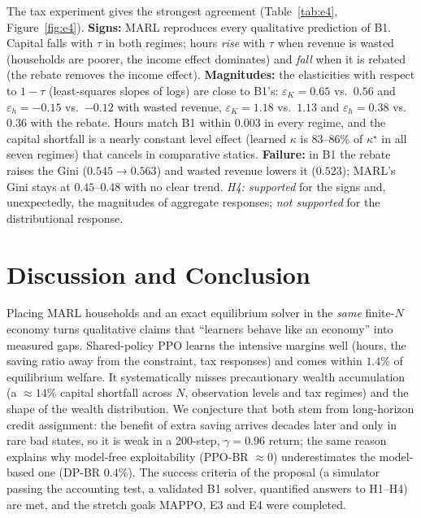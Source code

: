 \documentclass{article}
\begin{document}
The tax experiment gives the strongest agreement (Table~\ref{tab:e4}, Figure~\ref{fig:e4}). \textbf{Signs:} MARL reproduces every qualitative prediction of B1. Capital falls with $\tau$ in both regimes; hours \emph{rise} with $\tau$ when revenue is wasted (households are poorer, the income effect dominates) and \emph{fall} when it is rebated (the rebate removes the income effect). \textbf{Magnitudes:} the elasticities with respect to $1-\tau$ (least-squares slopes of logs) are close to B1's: $\varepsilon_K=0.65$ vs.\ $0.56$ and $\varepsilon_h=-0.15$ vs.\ $-0.12$ with wasted revenue, $\varepsilon_K=1.18$ vs.\ $1.13$ and $\varepsilon_h=0.38$ vs.\ $0.36$ with the rebate. Hours match B1 within $0.003$ in every regime, and the capital shortfall is a nearly constant level effect (learned $\kappa$ is $83$--$86\%$ of $\kappa^\star$ in all seven regimes) that cancels in comparative statics. \textbf{Failure:} in B1 the rebate raises the Gini ($0.545\to0.563$) and wasted revenue lowers it ($0.523$); MARL's Gini stays at $0.45$--$0.48$ with no clear trend. \emph{H4: supported} for the signs and, unexpectedly, the magnitudes of aggregate responses; \emph{not supported} for the distributional response.

\FloatBarrier %
\section{Discussion and Conclusion}
Placing MARL households and an exact equilibrium solver in the \emph{same} finite-$N$ economy turns qualitative claims that ``learners behave like an economy'' into measured gaps. Shared-policy PPO learns the intensive margins well (hours, the saving ratio away from the constraint, tax responses) and comes within $1.4\%$ of equilibrium welfare. It systematically misses precautionary wealth accumulation (a ${\approx}14\%$ capital shortfall across $N$, observation levels and tax regimes) and the shape of the wealth distribution. We conjecture that both stem from long-horizon credit assignment: the benefit of extra saving arrives decades later and only in rare bad states, so it is weak in a 200-step, $\gamma=0.96$ return; the same reason explains why model-free exploitability (PPO-BR $\approx0$) underestimates the model-based one (DP-BR $0.4\%$). The success criteria of the proposal (a simulator passing the accounting test, a validated B1 solver, quantified answers to H1--H4) are met, and the stretch goals MAPPO, E3 and E4 were completed.
\end{document}
